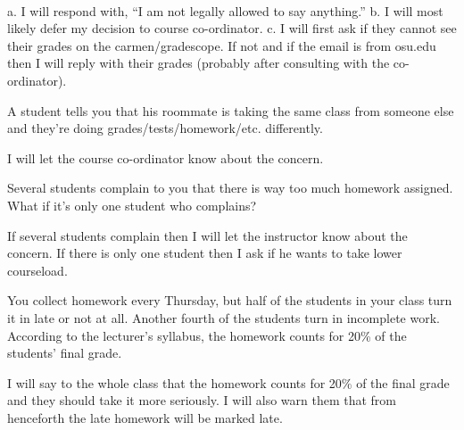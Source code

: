 \begin{solution}\ \\
    a. I will respond with, ``I am not legally allowed to say anything.''
    b. I will most likely defer my decision to course co-ordinator.
    c. I will first ask if they cannot see their grades on the carmen/gradescope. If not and if the email is from osu.edu then I will reply with their grades (probably after consulting with the co-ordinator). 
\end{solution}

\begin{prob}
    A student tells you that his roommate is taking the same class from someone else and they're doing
grades/tests/homework/etc. differently. 
\end{prob}

\begin{solution}
    I will let the course co-ordinator know about the concern.
\end{solution}

\begin{prob}
    Several students complain to you that there is way too much homework assigned. What if it’s only one
student who complains?
\end{prob}

\begin{solution}
    If several students complain then I will let the instructor know about the concern. If there is only one student then I ask if he wants to take lower courseload.
\end{solution}

\begin{prob}
    You collect homework every Thursday, but half of the students in your class turn it in late or not at all.
Another fourth of the students turn in incomplete work. According to the lecturer's syllabus, the homework
counts for 20\% of the students' final grade. 
\end{prob}

\begin{solution}
    I will say to the whole class that the homework counts for 20\% of the final grade and they should take it more seriously. I will also warn them that from henceforth the late homework will be marked late.
\end{solution}